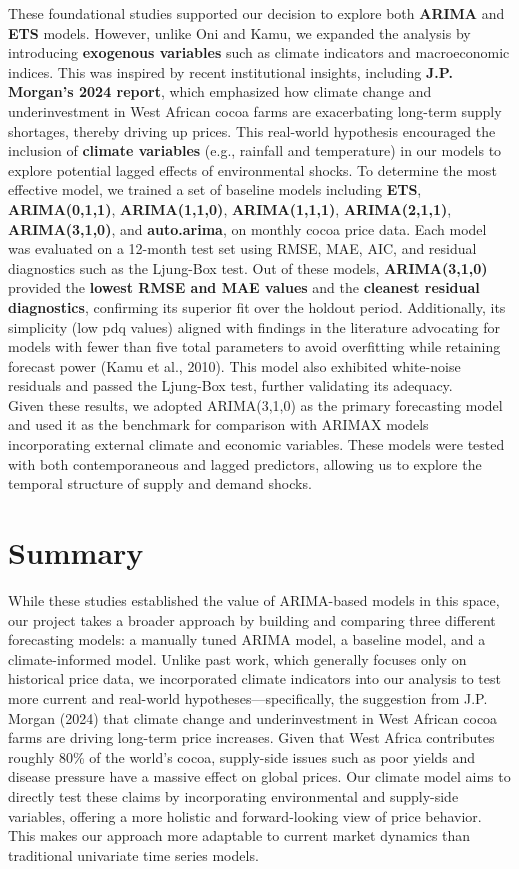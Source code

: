 These foundational studies supported our decision to explore both \textbf{ARIMA} and \textbf{ETS} models. However, unlike Oni and Kamu, we expanded the analysis by introducing \textbf{exogenous variables} such as climate indicators and macroeconomic indices. This was inspired by recent institutional insights, including \textbf{J.P. Morgan’s 2024 report}, which emphasized how climate change and underinvestment in West African cocoa farms are exacerbating long-term supply shortages, thereby driving up prices. This real-world hypothesis encouraged the inclusion of \textbf{climate variables} (e.g., rainfall and temperature) in our models to explore potential lagged effects of environmental shocks. To determine the most effective model, we trained a set of baseline models including \textbf{ETS}, \textbf{ARIMA(0,1,1)}, \textbf{ARIMA(1,1,0)}, \textbf{ARIMA(1,1,1)}, \textbf{ARIMA(2,1,1)}, \textbf{ARIMA(3,1,0)}, and \textbf{auto.arima}, on monthly cocoa price data. Each model was evaluated on a 12-month test set using RMSE, MAE, AIC, and residual diagnostics such as the Ljung-Box test. Out of these models, \textbf{ARIMA(3,1,0)} provided the \textbf{lowest RMSE and MAE values} and the \textbf{cleanest residual diagnostics}, confirming its superior fit over the holdout period. Additionally, its simplicity (low pdq values) aligned with findings in the literature advocating for models with fewer than five total parameters to avoid overfitting while retaining forecast power (Kamu et al., 2010). This model also exhibited white-noise residuals and passed the Ljung-Box test, further validating its adequacy. \\

Given these results, we adopted ARIMA(3,1,0) as the primary forecasting model and used it as the benchmark for comparison with ARIMAX models incorporating external climate and economic variables. These models were tested with both contemporaneous and lagged predictors, allowing us to explore the temporal structure of supply and demand shocks.

\section{Summary}
While these studies established the value of ARIMA-based models in this space, our project takes a broader approach by building and comparing three different forecasting models: a manually tuned ARIMA model, a baseline model, and a climate-informed model. Unlike past work, which generally focuses only on historical price data, we incorporated climate indicators into our analysis to test more current and real-world hypotheses—specifically, the suggestion from J.P. Morgan (2024) that climate change and underinvestment in West African cocoa farms are driving long-term price increases. Given that West Africa contributes roughly 80\% of the world’s cocoa, supply-side issues such as poor yields and disease pressure have a massive effect on global prices. Our climate model aims to directly test these claims by incorporating environmental and supply-side variables, offering a more holistic and forward-looking view of price behavior. This makes our approach more adaptable to current market dynamics than traditional univariate time series models.


